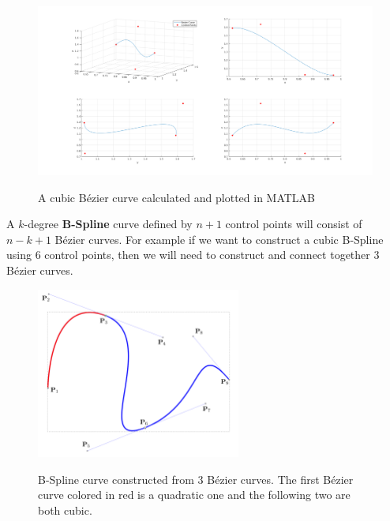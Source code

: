\begin{center}
\begin{figure}[!htb]
\centering
\includegraphics[width=\textwidth]{images/bezier_path.png}\\
\caption{A cubic B\'ezier curve calculated and plotted in MATLAB} 
\end{figure}
\end{center}

A $k$-degree \textbf{B-Spline} curve defined by $n+1$ control points will consist of $n-k+1$ B\'ezier curves. For example if we want to construct a cubic B-Spline using 6 control points, then we will need to construct 
and connect together 3 B\'ezier curves.

\begin{center}
\begin{figure}[!htb]
\centering
\includegraphics[width=0.6\textwidth]{images/b-spline-explanation.png}\\
\caption{B-Spline curve constructed from 3 B\'ezier curves. The first B\'ezier curve colored in red is a quadratic one and the following two are both cubic.} 
\label{b-spline-explanation}
\end{figure}
\end{center}


